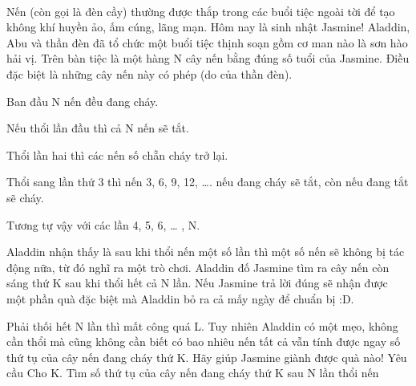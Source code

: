  

Nến (còn gọi là đèn cầy) thường được thắp trong các buổi tiệc ngoài tời để tạo không khí huyền ảo, ấm cúng, lãng mạn. Hôm nay là sinh nhật Jasmine! Aladdin, Abu và thần đèn đã tổ chức một buổi tiệc thịnh soạn gồm cơ man nào là sơn hào hải vị. Trên bàn tiệc là một hàng N cây nến bằng đúng số tuổi của Jasmine. Điều đặc biệt là những cây nến này có phép (do của thần đèn).

Ban đầu N nến đều đang cháy.

Nếu thổi lần đầu thì cả N nến sẽ tắt.

Thổi lần hai thì các nến số chẵn cháy trở lại.

Thổi sang lần thứ 3 thì nến 3, 6, 9, 12, …. nếu đang cháy sẽ tắt, còn nếu đang tắt sẽ cháy.

Tương tự vậy với các lần 4, 5, 6, … , N.

Aladdin nhận thấy là sau khi thổi nến một số lần thì một số nến sẽ không bị tác động nữa, từ đó nghĩ ra một trò chơi. Aladdin đố Jasmine tìm ra cây nến còn sáng thứ K sau khi thổi hết cả N lần. Nếu Jasmine trả lời đúng sẽ nhận được một phần quà đặc biệt mà Aladdin bỏ ra cả mấy ngày để chuẩn bị :D.

Phải thối hết N lần thì mất công quá L. Tuy nhiên Aladdin có một mẹo, không cần thổi mà cũng không cần biết có bao nhiêu nến tất cả vẫn tính được ngay số thứ tụ của cây nến đang cháy thứ K. Hãy giúp Jasmine giành được quà nào!
Yêu cầu
Cho K. Tìm số thứ tụ của cây nến đang cháy thứ K sau N lần thổi nến